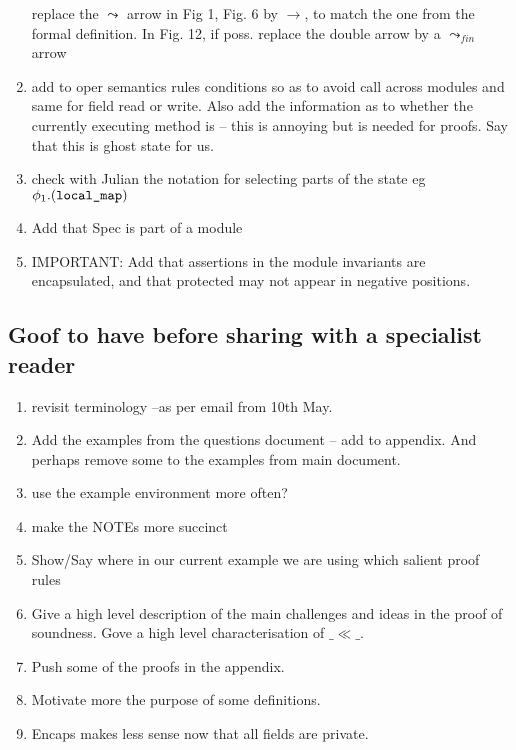 \documentclass[acmsmall,review,anonymous]{acmart}\settopmatter{printfolios=true}
\begin{document}
\begin{enumerate}
replace the $\leadsto$ arrow in Fig 1, Fig. 6 by $\rightarrow$, to match the one from the formal definition. In Fig. 12, if poss. replace the double arrow by a $\leadsto_{fin}$ arrow 

\item
add to oper semantics rules conditions so as to avoid call across modules and same for field read or write. Also add the information as to whether the currently executing  method is  -- this is annoying but is needed for proofs. Say that this is ghost state for us.

\item
check with Julian the notation for selecting parts of the state eg $\phi_1.(\mbox{\normalfont{\texttt{local\_map}}})$

\item
Add that Spec is part of a module

\item
IMPORTANT: Add that assertions in the module invariants are encapsulated, and that protected may not appear in negative positions.

\end{enumerate}

 \subsection{Goof to have before sharing with a specialist reader}

\begin{enumerate}
\item
revisit terminology --as per email from 10th May.
\item
Add the examples from the questions document -- add to appendix. And perhaps remove some to the examples from main document.

\item
use the example environment more often?

\item
make the NOTEs more succinct

\item
Show/Say where in our current example we are using which salient proof rules

\item
Give a high level description of the main challenges and ideas in the proof of soundness. Gove a high level characterisation of $\_\ll\_$.

\item
Push some of the proofs in the appendix.

\item
Motivate more the purpose of some definitions.

\item
Encaps makes less sense now that all fields are private. 

\end{enumerate}
\end{document}
